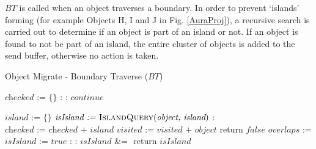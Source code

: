 $BT$ is called when an object traverses a boundary. In order to prevent `islands' forming (for example Objects H, I and J in Fig. \ref{AuraProj}), a recursive search is carried out to determine if an object is part of an island or not. If an object is found to not be part of an island, the entire cluster of objects is added to the send buffer, otherwise no action is taken.

\begin{algorithm}
	\caption{Object Migrate - Boundary Traverse ($BT$)}\label{boundaryAlgorithm}
	\begin{algorithmic}[1]	
		\State $\textit{checked := \{\}}$	
		\State
		 : 
		:
		\State $\textit{continue}$
		\EndIf
		
		\State $\textit{island := \{\}}$
		\State $\textit{isIsland := }\Call{IslandQuery}{\textit{object, island}}$
		:
		\State {}
		\EndIf
		\State $\textit{checked := checked + island}$
		\EndFor
		\EndProcedure
		\State
		\State $\textit{visited := visited + object}$
		\State return $\textit{false}$
		\EndIf
		\State
		\State $\textit{overlaps :=}$ 
		\State
		\State $\textit{isIsland := true}$
		 :
		:
		\State $\textit{isIsland \&= }$ 
		\EndIf
		\EndFor
		\State return $\textit{isIsland}$
		\EndFunction
	\end{algorithmic}
\end{algorithm}

